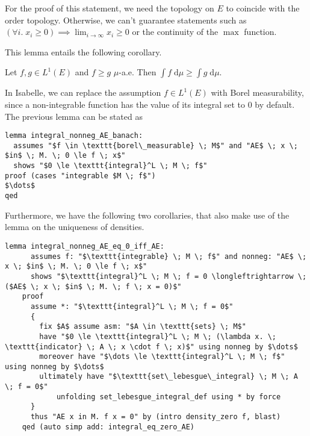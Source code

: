 \begin{remark}
For the proof of this statement, we need the topology on $E$ to coincide with the order topology. Otherwise, we can't guarantee statements such as $(\forall i. \; x_i \ge 0) \implies \lim_{i \to \infty} x_i \ge 0$ or the continuity of the $\max$ function.
\end{remark}
This lemma entails the following corollary.
\begin{corollary}
	Let $f, g \in L^1(E)$ and $f \ge g$ $\mu$-a.e. Then $\int f\;\textrm{d} \mu \ge \int g\;\textrm{d} \mu$.
\end{corollary}

In Isabelle, we can replace the assumption $f \in L^1(E)$ with Borel measurability, since a non-integrable function has the value of its integral set to $0$ by default. The previous lemma can be stated as

{\small
\begin{lstlisting}[style=isabelle]
lemma integral_nonneg_AE_banach:
  assumes "$f \in \texttt{borel\_measurable} \; M$" and "AE$ \; x \; $in$ \; M. \; 0 \le f \; x$"
  shows "$0 \le \texttt{integral}^L \; M \; f$"
proof (cases "integrable $M \; f$") 
$\dots$
qed
\end{lstlisting}
}

Furthermore, we have the following two corollaries, that also make use of the lemma on the uniqueness of densities.

\begin{isacorollary}
{\small
	\begin{lstlisting}[style=isabelle]
	lemma integral_nonneg_AE_eq_0_iff_AE:
	  assumes f: "$\texttt{integrable} \; M \; f$" and nonneg: "AE$ \; x \; $in$ \; M. \; 0 \le f \; x$"
	  shows "$\texttt{integral}^L \; M \; f = 0 \longleftrightarrow \; ($AE$ \; x \; $in$ \; M. \; f \; x = 0)$"
	proof 
	  assume *: "$\texttt{integral}^L \; M \; f = 0$"
	  {
		fix $A$ assume asm: "$A \in \texttt{sets} \; M$"
		have "$0 \le \texttt{integral}^L \; M \; (\lambda x. \; \texttt{indicator} \; A \; x \cdot f \; x)$" using nonneg by $\dots$
		moreover have "$\dots \le \texttt{integral}^L \; M \; f$" using nonneg by $\dots$
		ultimately have "$\texttt{set\_lebesgue\_integral} \; M \; A \; f = 0$" 
			unfolding set_lebesgue_integral_def using * by force
	  }
	  thus "AE x in M. f x = 0" by (intro density_zero f, blast)
	qed (auto simp add: integral_eq_zero_AE)
	\end{lstlisting}
}
\end{isacorollary}


